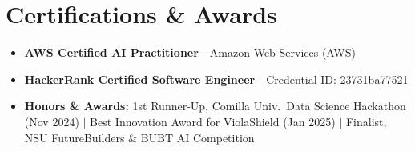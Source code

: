 \documentclass[9.5pt,a4paper]{article}
\begin{document}
\section*{Certifications \& Awards}
\begin{itemize}
    \item \textbf{AWS Certified AI Practitioner} - Amazon Web Services (AWS)
    \item \textbf{HackerRank Certified Software Engineer} - Credential ID: \href{https://www.hackerrank.com/certificates/23731ba77521}{23731ba77521}
    \item \textbf{Honors \& Awards:} 1st Runner-Up, Comilla Univ.\ Data Science Hackathon (Nov 2024) $\vert$ Best Innovation Award for ViolaShield (Jan 2025) $\vert$ Finalist, NSU FutureBuilders \& BUBT AI Competition
\end{itemize}
\end{document}
